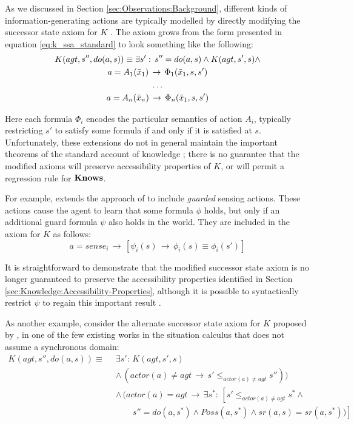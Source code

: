 As we discussed in Section \ref{sec:Observations:Background}, different
kinds of information-generating actions are typically modelled by
directly modifying the successor state axiom for $K$ \citep{shapiro98specifying_ma_systems,Lesperance99sitcalc_approach,shapiro01casl_feat_inter,Petrick06thesis,shapiro07sc_goal_change}.
The axiom grows from the form presented in equation \eqref{eq:k_ssa_standard}
to look something like the following:\begin{gather*}
K(agt,s'',do(a,s))\equiv\exists s':\, s''=do(a,s)\wedge K(agt,s',s)\wedge\\
a=A_{1}(\bar{x}_{1})\,\rightarrow\,\Phi_{1}(\bar{x}_{1},s,s')\\
\dots\\
a=A_{n}(\bar{x}_{n})\,\rightarrow\,\Phi_{n}(\bar{x}_{1},s,s')\end{gather*}


Here each formula $\Phi_{i}$ encodes the particular semantics of
action $A_{i}$, typically restricting $s'$ to satisfy some formula
if and only if it is satisfied at $s$. Unfortunately, these extensions
do not in general maintain the important theorems of the standard
account of knowledge \citep{scherl03sc_knowledge}; there is no guarantee
that the modified axioms will preserve accessibility properties of
$K$, or will permit a regression rule for $\mathbf{Knows}$.

For example, \citet{Petrick06thesis} extends the approach of \citep{scherl03sc_knowledge}
to include \emph{guarded} sensing actions. These actions cause the
agent to learn that some formula $\phi$ holds, but only if an additional
guard formula $\psi$ also holds in the world. They are included in
the axiom for $K$ as follows:\[
a=sense_{i}\,\rightarrow\,\left[\psi_{i}(s)\,\rightarrow\,\phi_{i}(s)\equiv\phi_{i}(s')\right]\]


It is straightforward to demonstrate that the modified successor state
axiom is no longer guaranteed to preserve the accessibility properties
identified in Section \ref{sec:Knowledge:Accessibility-Properties},
although it is possible to syntactically restrict $\psi$ to regain
this important result \citep{Petrick06thesis}.

As another example, consider the alternate successor state axiom for
$K$ proposed by \citet{Lesperance99sitcalc_approach}, in one of
the few existing works in the situation calculus that does not assume
a synchronous domain:\begin{align*}
K(agt,s'',do(a,s))\equiv\,\,\, & \exists s':\, K(agt,s',s)\\
 & \wedge\,(actor(a)\neq agt\,\rightarrow\, s'\leq_{actor(a)\neq agt}s''))\\
 & \wedge\,(actor(a)=agt\,\rightarrow\,\exists s^{*}:\,\left[s'\leq_{actor(a)\neq agt}s^{*}\wedge\right.\\
 & \,\,\,\,\,\,\,\,\,\,\,\,\left.s''=do(a,s^{*})\wedge Poss(a,s^{*})\wedge sr(a,s)=sr(a,s^{*}))\right]\end{align*}


